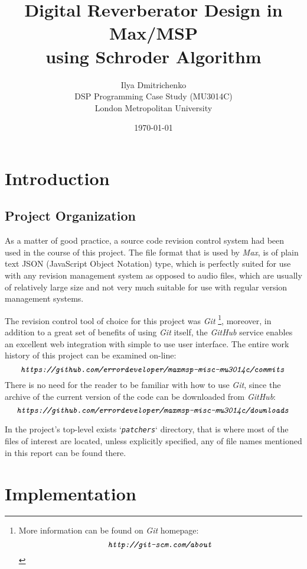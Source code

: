 \documentclass[12pt]{report}
\title{Digital Reverberator Design in Max/MSP\\using Schroder Algorithm}
\author{Ilya Dmitrichenko
\\\small DSP Programming Case Study (MU3014C)
\\\small London Metropolitan University}
\date{\today}
\newcommand{\URL}[1]{\[ \texttt{\emph{#1}} \]}
\newcommand{\href}[2]{#2 (\texttt{\emph{\url{#1}}})} %
\newcommand{\Href}[2]{{#2}} %
\newcommand{\Href}[2]{\href{#1}{#2}} %
\newcommand{\URL}[1]{\[ \Href{#1}{\texttt{\emph{#1}}} \]}
\begin{document}
\maketitle


\section{Introduction}

  \subsection{Project Organization}

  As a matter of good practice, a source code revision control system had
  been used in the course of this project. The file format that is used by
  \emph{Max}, is of plain text JSON (JavaScript Object Notation) type, which
  is perfectly suited for use with any revision management system as opposed
  to audio files, which are usually of relatively large size and not very
  much suitable for use with regular version management systems. 

  The revision control tool of choice for this project was \emph{Git}
  \footnote{More information can be found on \emph{Git} homepage:
  \URL{http://git-scm.com/about}}, moreover, in addition to a great set of
  benefits of using \emph{Git} itself, the \emph{GitHub} service enables an
  excellent web integration with simple to use user interface. The entire
  work history of this project can be examined on-line:
  \URL{https://github.com/errordeveloper/maxmsp-misc-mu3014c/commits}
  There is no need for the reader to be familiar with how to use \emph{Git},
  since the archive of the current version of the code can be downloaded
  from \emph{GitHub}:
  \URL{https://github.com/errordeveloper/maxmsp-misc-mu3014c/downloads}


  In the project's top-level exists `\emph{\texttt{patchers}}` directory, that
  is where most of the files of interest are located, unless explicitly specified,
  any of file names mentioned in this report can be found there.


  \subsection{}

\section{Implementation}
\end{document}
